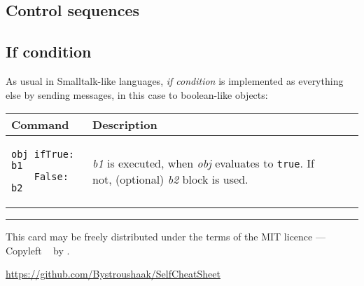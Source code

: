 \documentclass[10pt]{article}
\begin{document}
\begin{multicols*}{3}
\section{Control sequences}
\subsection{If condition}

As usual in Smalltalk-like languages, \textit{if condition} is implemented as everything else by sending messages, in this case to boolean-like objects:

\vspace*{0.2cm}
\begin{tabular}{ p{70pt} p{140pt} l l }
Command & Description \\ \hline
\begin{lstlisting}
obj ifTrue: b1
    False: b2
\end{lstlisting}
&\vspace*{0.1cm} \textit{b1} is executed, when \textit{obj} evaluates to \texttt{true}.
If not, (optional) \textit{b2} block is used. \\
\hline


\end{tabular}





\vfill \hrule\smallskip
{\small This card may be freely distributed under
the terms of the MIT licence ---
Copyleft \textcopyleft\ \thedate{} by \href{http://kitakitsune.org}{\theauthor}.

\url{https://github.com/Bystroushaak/SelfCheatSheet}
}

\end{multicols*}
\end{document}

